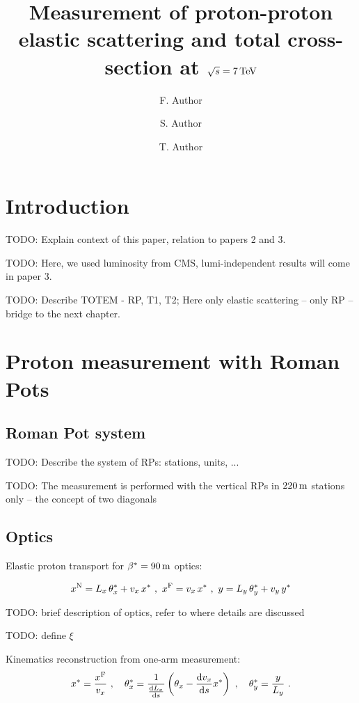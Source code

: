 \documentclass[doublecol]{../macros/epl2}
\title{Measurement of proton-proton elastic scattering and total cross-section at $\sqrt s = 7\,\rm TeV$}
\author{F. Author\inst{1,2} \and S. Author\inst{1} \and T. Author\inst{2}}
\institute{                    
  \inst{1} First Institute - Address\\
  \inst{2} Second Institute - Address
}
\def\d{{\rm d}}
\def\un#1{\,{\rm #1}}
\begin{document}
\maketitle

\section{Introduction}

TODO: Explain context of this paper, relation to papers 2 and 3.

TODO: Here, we used luminosity from CMS, lumi-independent results will come in paper 3.

TODO: Describe TOTEM - RP, T1, T2; Here only elastic scattering -- only RP -- bridge to the next chapter.


\section{Proton measurement with Roman Pots}

\subsection{Roman Pot system}

TODO: Describe the system of RPs: stations, units, ...

TODO: The measurement is performed with the vertical RPs in $220\un{m}$ stations only -- the concept of two diagonals

\subsection{Optics}

Elastic proton transport for $\beta^* = 90\un{m}$ optics:

\begin{equation}
\label{transport}
x^{\rm N} = L_x\,\theta^*_x + v_x\,x^*\ ,\ 
x^{\rm F} = v_x\,x^*\ ,\ 
y = L_y\,\theta^*_y + v_y\,y^*
\end{equation}


TODO: brief description of optics, refer to \cite{epl96} where details are discussed

TODO: define $\xi$

Kinematics reconstruction from one-arm measurement:
\begin{equation}
\label{reconstruction}
x^* = {x^{\rm F}\over v_x}\ ,\quad
\theta^*_x = {1\over {\d L_x\over \d s}} \left( \theta_x - {\d v_x\over \d s} x^* \right)\ ,\quad
\theta^*_y = {y\over L_y}\ .
\end{equation}
\end{document}
